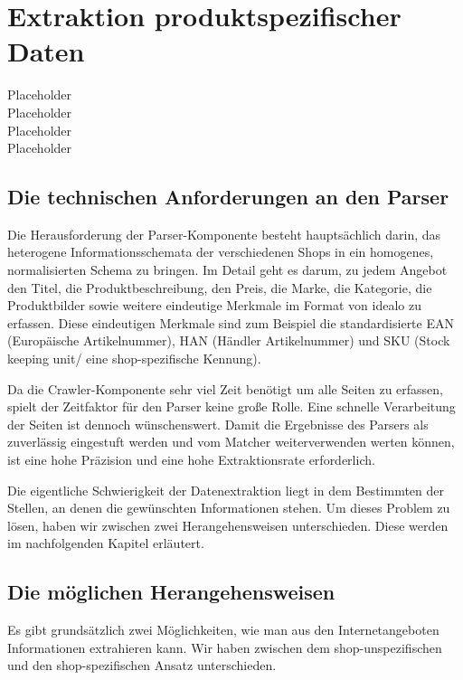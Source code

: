 \section{Extraktion produktspezifischer Daten}
\label{sec:extraktion-produktspezifischer-daten}

Placeholder \\
Placeholder \\
Placeholder \\
Placeholder

\subsection{Die technischen Anforderungen an den Parser}
\label{subsec:technische-anforderungen-parser}

Die Herausforderung der Parser-Komponente besteht hauptsächlich darin, das heterogene Informationsschemata der
verschiedenen Shops in ein homogenes, normalisierten Schema zu bringen.
Im Detail geht es darum, zu jedem Angebot den Titel, die Produktbeschreibung, den Preis, die Marke, die Kategorie,
die Produktbilder sowie weitere eindeutige Merkmale im Format von idealo zu erfassen.
Diese eindeutigen Merkmale sind zum Beispiel die standardisierte EAN (Europäische Artikelnummer), HAN (Händler
Artikelnummer) und SKU (Stock keeping unit/ eine shop-spezifische Kennung).

Da die Crawler-Komponente sehr viel Zeit benötigt um alle Seiten zu erfassen, spielt der Zeitfaktor für den Parser
keine große Rolle.
Eine schnelle Verarbeitung der Seiten ist dennoch wünschenswert.
Damit die Ergebnisse des Parsers als zuverlässig eingestuft werden und vom Matcher weiterverwenden werten können, ist
eine hohe Präzision und eine hohe Extraktionsrate erforderlich.

Die eigentliche Schwierigkeit der Datenextraktion liegt in dem Bestimmten der Stellen, an denen die gewünschten
Informationen stehen.
Um dieses Problem zu lösen, haben wir zwischen zwei Herangehensweisen unterschieden.
Diese werden im nachfolgenden Kapitel erläutert.

\subsection{Die möglichen Herangehensweisen}
\label{subsec:herangehensweisen}

Es gibt grundsätzlich zwei Möglichkeiten, wie man aus den Internetangeboten Informationen extrahieren kann.
Wir haben zwischen dem shop-unspezifischen und den shop-spezifischen Ansatz unterschieden.


